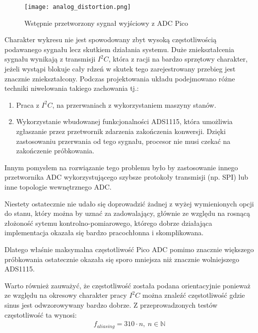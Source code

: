     \begin{figure}[H]
        \centering
        \texttt{[image: analog\_distortion.png]}
        \caption{Wstępnie przetworzony sygnał wyjściowy z ADC Pico}
        \label{fig:analog_distortion}
    \end{figure}

    Charakter wykresu nie jest spowodowany zbyt wysoką częstotliwością podawanego
    sygnału lecz skutkiem działania systemu. Duże zniekształcenia sygnału wynikają
    z transmisji $I^2C$, która z racji na bardzo sprzętowy charakter, jeżeli wystąpi blokuje
    cały rdzeń w skutek tego zarejestrowany przebieg jest znacznie zniekształcony.
    Podczas projektowania układu podejmowano różne techniki niwelowania takiego zachowania tj.: 
    \begin{enumerate}
        \item Praca z $I^2C$, na przerwaniach z wykorzystaniem maszyny stanów.
        \item Wykorzystanie wbudowanej funkcjonalności ADS1115, która umożliwia zgłaszanie przez
        przetwornik zdarzenia zakończenia konwersji. 
        Dzięki zastosowaniu przerwania od tego sygnału, procesor nie musi czekać na zakończenie próbkowania.
    \end{enumerate}

    Innym pomysłem na rozwiązanie tego problemu było by zastosowanie innego przetwornika ADC wykorzystującego szybsze protokoły transmisji (np. SPI)
    lub inne topologie wewnętrznego ADC.

    Niestety ostatecznie nie udało się doprowadzić żadnej z wyżej wymienionych opcji do stanu,
    który można by uznać za zadowalający, głównie ze względu na rosnącą złożoność sytemu kontrolno-pomiarowego,
    którego dobrze działająca implementacja okazała się bardzo pracochłonna i skomplikowana.
    
    Dlatego właśnie maksymalna częstotliwość Pico ADC pomimo znacznie większego
    próbkowania ostatecznie okazała się sporo mniejsza niż znacznie wolniejszego ADS1115.  

    Warto również zauważyć, że częstotliwość została podana orientacyjnie ponieważ ze względu
    na okresowy charakter pracy $I^2C$ można znaleźć częstotliwość gdzie sinus jest odwzorowywany bardzo dobrze.
    Z przeprowadzonych testów częstotliwość ta wynosi:
    \begin{align}
        f_{aliasing} = 310 \cdot n,\ n \in \mathbb{N}
    \end{align}